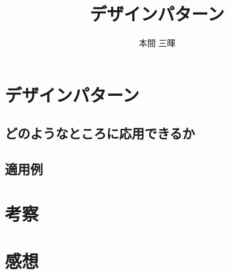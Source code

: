 \documentclass[titlepage,a4paper]{jsarticle}
\title{デザインパターン}
\author{本間 三暉}
\begin{document}
\maketitle
\section{デザインパターン}

\subsection{どのようなところに応用できるか}

\subsection{適用例}

\section{考察}

\section{感想}
\end{document}
